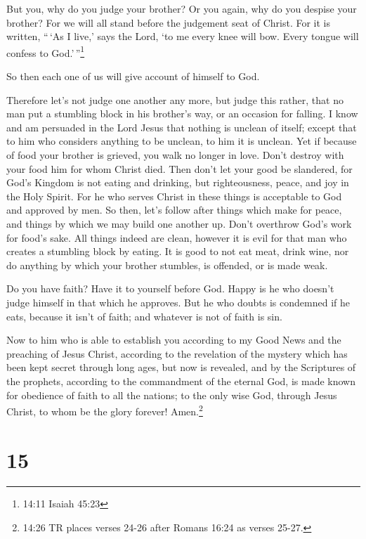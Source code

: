  But you, why do you judge your brother? Or you again, why
do you despise your brother? For we will all stand before the judgement
seat of Christ.  For it is written, ``\,`As I live,' says
the Lord, `to me every knee will bow. Every tongue will confess to
God.'\,''\footnote{14:11 Isaiah 45:23}

 So then each one of us will give account of himself to
God.

 Therefore let's not judge one another any more, but judge
this rather, that no man put a stumbling block in his brother's way, or
an occasion for falling.  I know and am persuaded in the
Lord Jesus that nothing is unclean of itself; except that to him who
considers anything to be unclean, to him it is unclean. 
Yet if because of food your brother is grieved, you walk no longer in
love. Don't destroy with your food him for whom Christ died.
 Then don't let your good be slandered,  for
God's Kingdom is not eating and drinking, but righteousness, peace, and
joy in the Holy Spirit.  For he who serves Christ in these
things is acceptable to God and approved by men.  So then,
let's follow after things which make for peace, and things by which we
may build one another up.  Don't overthrow God's work for
food's sake. All things indeed are clean, however it is evil for that
man who creates a stumbling block by eating.  It is good to
not eat meat, drink wine, nor do anything by which your brother
stumbles, is offended, or is made weak.

 Do you have faith? Have it to yourself before God. Happy
is he who doesn't judge himself in that which he approves. 
But he who doubts is condemned if he eats, because it isn't of faith;
and whatever is not of faith is sin.

 Now to him who is able to establish you according to my
Good News and the preaching of Jesus Christ, according to the revelation
of the mystery which has been kept secret through long ages,
 but now is revealed, and by the Scriptures of the
prophets, according to the commandment of the eternal God, is made known
for obedience of faith to all the nations;  to the only
wise God, through Jesus Christ, to whom be the glory forever!
Amen.\footnote{14:26 TR places verses 24-26 after Romans 16:24 as verses
  25-27.}

\hypertarget{section-14}{%
\section{15}\label{section-14}}

